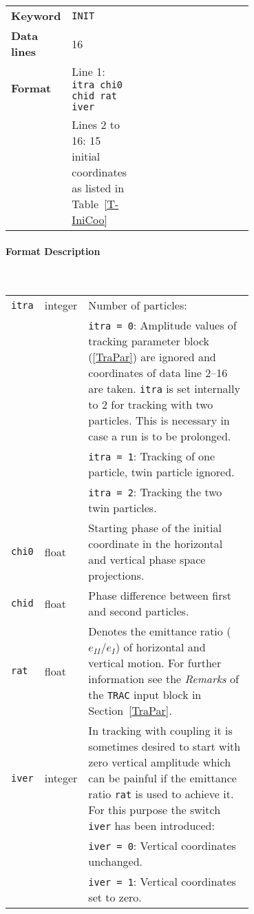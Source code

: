 \bigskip
\begin{tabular}{@{}llp{0.7\linewidth}}
    \textbf{Keyword}    & \texttt{INIT}\index{INIT} \\
    \textbf{Data lines} & 16 \\
    \textbf{Format}     & Line 1: \texttt{itra chi0 chid rat iver} \\
                        & Lines 2 to 16: 15 initial coordinates as listed in Table~\ref{T-IniCoo}
\end{tabular}

\paragraph{Format Description}~

\bigskip
\begin{longtabu}{@{}llp{0.7\linewidth}}
    \texttt{itra} & integer  & Number of particles: \\
                  &          & \texttt{itra = 0}: Amplitude values of tracking parameter block (\ref{TraPar}) are ignored and coordinates of data line 2--16 are taken. \texttt{itra} is set internally to 2 for tracking with two    particles. This is necessary in case a run is to be prolonged. \\
                  &          & \texttt{itra = 1}: Tracking of one particle, twin particle ignored. \\
                  &          & \texttt{itra = 2}: Tracking the two twin particles. \\
    \texttt{chi0} & float    & Starting phase of the initial coordinate in the horizontal and vertical phase space projections. \\
    \texttt{chid} & float    & Phase difference between first and second particles. \\
    \texttt{rat}  & float    & Denotes the emittance ratio ($e_{II}/e_I$) of horizontal and vertical motion. For further information see the \emph{Remarks} of the \texttt{TRAC} input block in Section~\ref{TraPar}. \\
    \texttt{iver} & integer  & In tracking with coupling it is sometimes desired to start with zero vertical amplitude which can be painful if the emittance ratio \texttt{rat} is used to achieve it. For this purpose the switch \texttt{iver} has been introduced: \\
                  &          & \texttt{iver = 0}: Vertical coordinates unchanged. \\
                  &          & \texttt{iver = 1}: Vertical coordinates set to zero.
\end{longtabu}

